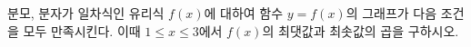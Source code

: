 \hspace*{2mm}\begin{minipage}[t]{\dimexpr\linewidth-2mm\relax}\vspace{0pt}
분모, 분자가 일차식인 유리식 $f(x)$에 대하여 함수 $y=f(x)$의 그래프가 다음 조건을 모두 만족시킨다. 이때 $1\le x\le 3$에서 $f(x)$의 최댓값과 최솟값의 곱을 구하시오. \end{minipage}
